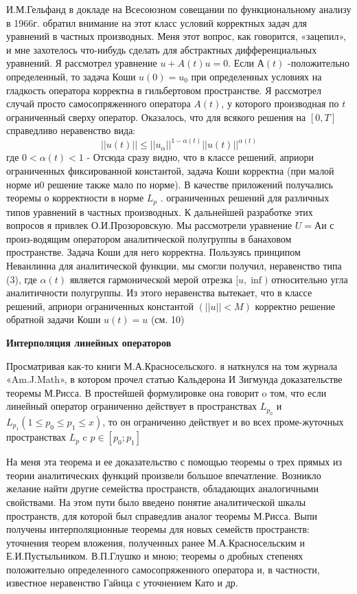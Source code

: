 И.М.Гельфанд в докладе на Всесоюзном совещании по функциональному анализу в 1966г. обратил внимание на этот класс условий корректных задач для уравнений в частных производных. Меня этот вопрос, как говорится, «зацепил», и мне захотелось что-нибудь сделать для абстрактных дифференциальных уравнений. Я рассмотрел уравнение $u + A(t)u = 0$. Если $А(t)$ -положительно определенный, то задача Коши $u(0)=u_0$ при определенных условиях на гладкость оператора корректна в гильбертовом пространстве. Я рассмотрел случай просто самосопряженного оператора $A(t)$, у которого производная по $t$ ограниченный сверху оператор. Оказалось, что для всякого решения на $[0,T]$ справедливо неравенство вида:
$$||u(t)||\leq||u_{\alpha}||^{1-\alpha(t)} ||u(t)||^{\alpha(t)}$$
где $0<\alpha(t) < 1$ - Отсюда сразу видно, что в классе решений, априори ограниченных фиксированной константой, задача Коши корректна (при малой норме и0 решение также мало по норме). В качестве приложений получались теоремы о корректности в норме $L_p$ . ограниченных решений для различных типов уравнений в частных производных. К дальнейшей разработке этих вопросов я привлек О.И.Прозоровскую. Мы рассмотрели уравнение $U = Аи$ с произ-водящим оператором аналитической полугруппы в банаховом пространстве. Задача Коши для него корректна. Пользуясь принципом Неванлинна для аналитической функции, мы смогли получил, неравенство типа (3), где $\alpha(t)$
является гармонической мерой отрезка $[u, \inf)$  относительно угла аналитичности полугруппы. Из этого неравенства вытекает, что в классе решений, априори ограниченных константой $(||u||<M)$ корректно решение обратной задачи Коши $u(t) = u$ (см. 10)

{\bf Интерполяция линейных операторов}

Просматривая как-то книги М.А.Красносельского. я наткнулся на том журнала «Am.J.Math», в котором прочел статью Кальдерона И Зигмунда  доказательстве теоремы М.Рисса. В простейшей формулировке она говорит o том, что если линейный оператор ограниченно действует в пространствах $L_{p_0}$ и  $L_{p_1} (1\leq p_0 \leq p_1 \leq x)$, то он ограниченно действует и во всех проме-жуточных пространствах $L_p$ c $p \in [p_0;p_1]$

На меня эта теорема и ее доказательство с помощью теоремы о трех прямых из теории аналитических функций произвели большое впечатление. Возникло желание найти другие семейства пространств, обладающих аналогичными свойствами. На этом пути было введено понятие аналитической шкалы пространств, для которой был справедлив аналог теоремы М.Рисса. Выпи получены интерполяционные теоремы для новых семейств пространств: уточнения теорем вложения, полученных ранее М.А.Красносельским и Е.И.Пустыльником. В.П.Глушко и мною; теоремы о дробных степенях положительно определенного самосопряженного оператора и, в частности, известное неравенство Гайнца с уточнением Като и др.

